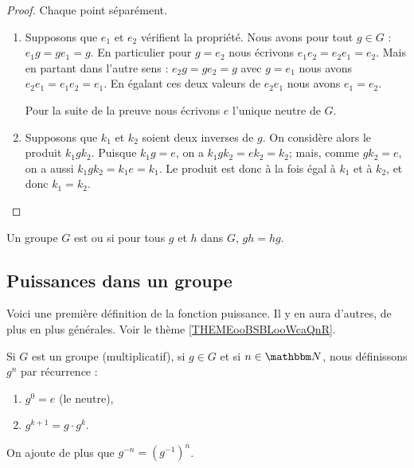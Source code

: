 \begin{proof}
    Chaque point séparément.
    \begin{enumerate}
        \item
            Supposons que \( e_1\) et \( e_2\) vérifient la propriété. Nous avons pour tout \( g\in G\) : \( e_1g=ge_1=g\). En particulier pour \( g=e_2\) nous écrivons \( e_1e_2=e_2e_1=e_2\). Mais en partant dans l'autre sens : \( e_2g=ge_2=g\) avec \( g=e_1\) nous avons \( e_2e_1=e_1e_2=e_1\). En égalant ces deux valeurs de \( e_2e_1\) nous avons \( e_1=e_2\).

            Pour la suite de la preuve nous écrivons \( e\) l'unique neutre de \( G\).

        \item
            Supposons que \( k_1\) et \( k_2\) soient deux inverses de \( g\). On considère alors le produit \( k_1 g k_2 \). Puisque \(k_1 g = e \), on a \( k_1 g k_2 = e k_2 = k_2 \); mais, comme \(g k_2 = e \), on a aussi \( k_1 g k_2 = k_1 e = k_1 \). Le produit est donc à la fois égal à \( k_1 \) et à \( k_2 \), et donc \( k_1 = k_2 \).
    \end{enumerate}
\end{proof}

\begin{definition}\label{DEFGroupeAbelien}
    Un groupe \( G\) est  ou  si pour tous \( g\) et \( h\) dans \( G\), \( gh=hg\).
\end{definition}

\subsection{Puissances dans un groupe}

Voici une première définition de la fonction puissance. Il y en aura d'autres, de plus en plus générales. Voir le thème \ref{THEMEooBSBLooWcaQnR}.
\begin{definition}\label{DEFooGVSFooFVLtNo}
    Si \( G\) est un groupe (multiplicatif), si \( g\in G\) et si \( n\in \eN\), nous définissons \( g^n\) par récurrence :
    \begin{enumerate}
        \item
            \( g^0=e\) (le neutre),
        \item       \label{ITEMooOUIPooGjAgQb}
            \( g^{k+1}=g\cdot g^{k}\).
    \end{enumerate}
    On ajoute de plus que \( g^{-n} = (g^{-1})^n \).
\end{definition}


